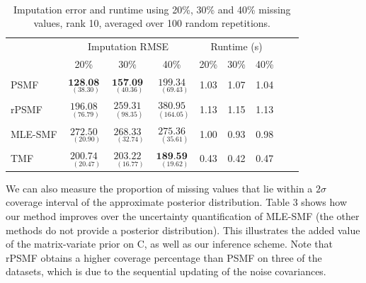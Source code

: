 \documentclass{mldsmsc}
\begin{document}
\begin{table}[H]
\centering
\label{tab:rmse10}
 \\[0.5ex]
\begin{tabular}{@{}lccc|ccccc@{}}
\toprule
 & \multicolumn{3}{c}{Imputation RMSE} & \multicolumn{3}{c}{Runtime (s)} \\
 & 20\% & 30\% & 40\% & 20\% & 30\% & 40\% \\
\midrule
PSMF & $\underset{{\scriptscriptstyle \;\;(38.30)}}{\textbf{128.08}}$ & $\underset{{\scriptscriptstyle \;\;(40.36)}}{\textbf{157.09}}$ & $\underset{{\scriptscriptstyle \;\;\;(69.43)}}{199.34}$ & 1.03 & 1.07 & 1.04 \\
rPSMF & $\underset{{\scriptscriptstyle \;\;(76.79)}}{196.08}$ & $\underset{{\scriptscriptstyle \;\;(98.35)}}{259.31}$ & $\underset{{\scriptscriptstyle \;\;(164.05)}}{380.95}$ & 1.13 & 1.15 & 1.13\\
MLE-SMF & $\underset{{\scriptscriptstyle \;\;\;(20.90)}}{272.50}$ & $\underset{{\scriptscriptstyle \;\;\;(32.74)}}{268.33}$ & $\underset{{\scriptscriptstyle \;\;\;(35.61)}}{275.36}$ & 1.00 & 0.93 & 0.98 \\
TMF & $\underset{{\scriptscriptstyle \;\;\;(20.47)}}{200.74}$ & $\underset{{\scriptscriptstyle \;\;\;(16.77)}}{203.22}$ & $\underset{{\scriptscriptstyle \;\;\;(19.62)}}{\textbf{189.59}}$ & 0.43 & 0.42 & 0.47 \\
\bottomrule
\end{tabular}
\caption{Imputation error and runtime using 20\%, 30\% and 40\% missing values, rank 10, averaged over 100 random repetitions.}
\end{table}

\noindent We can also measure the proportion of missing values that lie within a $2\sigma$ coverage interval of the approximate posterior distribution. Table 3 shows how our method improves over the uncertainty quantification of MLE-SMF (the other methods do not provide a posterior distribution). This illustrates the added value of the matrix-variate prior on C, as well as our inference scheme. Note that rPSMF obtains a higher coverage percentage than PSMF on three of the datasets, which is due to the sequential updating of the noise covariances. \newline
\end{document}
